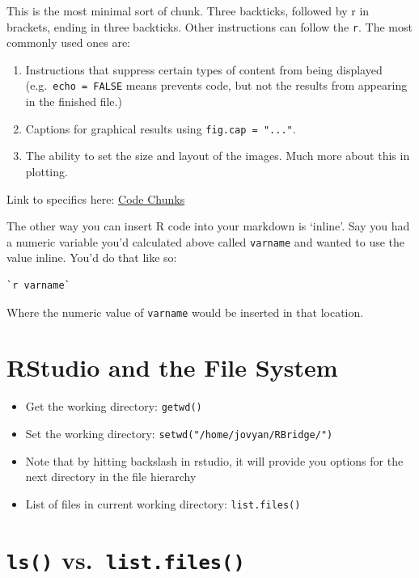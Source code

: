 \documentclass[
]{book}
\begin{document}
This is the most minimal sort of chunk. Three backticks, followed by r in brackets,
ending in three backticks. Other instructions can follow the \texttt{r}. The most commonly used ones are:

\begin{enumerate}
\def\labelenumi{\arabic{enumi}.}
\item
  Instructions that suppress certain types of content from being displayed
  (e.g.~\texttt{echo\ =\ FALSE} means prevents code, but not the results from appearing in the finished file.)
\item
  Captions for graphical results using \texttt{fig.cap\ =\ "..."}.
\item
  The ability to set the size and layout of the images. Much more about this in
  plotting.
\end{enumerate}

Link to specifics here: \href{https://rmarkdown.rstudio.com/lesson-3.html}{Code Chunks}

The other way you can insert R code into your markdown is `inline'. Say you had a numeric variable you'd calculated above called \texttt{varname} and wanted to use the value inline. You'd do that like so:

\begin{verbatim}
`r varname`
\end{verbatim}

Where the numeric value of \texttt{varname} would be inserted in that location.

\hypertarget{rstudio-and-the-file-system}{%
\section{RStudio and the File System}\label{rstudio-and-the-file-system}}

\begin{itemize}
\item
  Get the working directory: \texttt{getwd()}
\item
  Set the working directory: \texttt{setwd("/home/jovyan/RBridge/")}
\item
  Note that by hitting backslash in rstudio, it will provide you options for the
  next directory in the file hierarchy
\item
  List of files in current working directory: \texttt{list.files()}
\end{itemize}

\hypertarget{ls-vs.-list.files}{%
\section{\texorpdfstring{\texttt{ls()} vs.~\texttt{list.files()}}{ls() vs.~list.files()}}\label{ls-vs.-list.files}}
\end{document}
